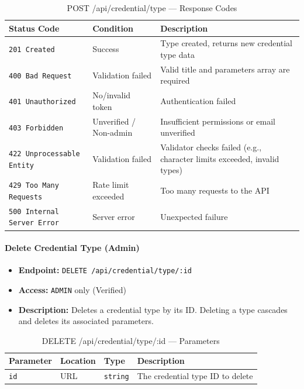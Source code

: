 \begin{table}[H]
\centering
\renewcommand{\arraystretch}{1.3}
\begin{tabularx}{\textwidth}{|l|l|X|}
\hline
\textbf{Status Code} & \textbf{Condition} & \textbf{Description} \\
\hline
\texttt{201 Created}      & Success            & Type created, returns new credential type data \\
\hline
\texttt{400 Bad Request}  & Validation failed  & Valid title and parameters array are required \\
\hline
\texttt{401 Unauthorized} & No/invalid token   & Authentication failed \\
\hline
\texttt{403 Forbidden}    & Unverified / Non-admin & Insufficient permissions or email unverified \\
\hline
\texttt{422 Unprocessable Entity} & Validation failed & Validator checks failed (e.g., character limits exceeded, invalid types) \\
\hline
\texttt{429 Too Many Requests} & Rate limit exceeded & Too many requests to the API \\
\hline
\texttt{500 Internal Server Error} & Server error & Unexpected failure \\
\hline
\end{tabularx}
\caption{POST /api/credential/type — Response Codes}
\label{tab:create-credential-type-responses}
\end{table}
\FloatBarrier

\paragraph{Delete Credential Type (Admin)}
\label{subsubsec:delete-credential-type}

\begin{itemize}
  \item \textbf{Endpoint:} \texttt{DELETE /api/credential/type/:id}
  \item \textbf{Access:} \texttt{ADMIN} only (Verified)
  \item \textbf{Description:} Deletes a credential type by its ID.
  Deleting a type cascades and deletes its associated parameters.
\end{itemize}

\begin{table}[H]
\centering
\renewcommand{\arraystretch}{1.3}
\begin{tabularx}{\textwidth}{|l|l|l|X|}
\hline
\textbf{Parameter} & \textbf{Location} & \textbf{Type} & \textbf{Description} \\
\hline
\texttt{id} & URL & \texttt{string} & The credential type ID to delete \\
\hline
\end{tabularx}
\caption{DELETE /api/credential/type/:id — Parameters}
\label{tab:delete-credential-type-params}
\end{table}

